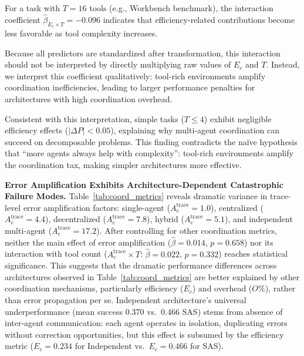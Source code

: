 For a task with $T = 16$ tools (e.g., Workbench benchmark), the interaction coefficient $\hat{\beta}_{E_c \times T} = -0.096$ indicates that efficiency-related contributions become less favorable as tool complexity increases. 

Because all predictors are standardized after transformation, this interaction should not be interpreted by directly multiplying raw values of $E_c$ and $T$. Instead, we interpret this coefficient qualitatively: tool-rich environments amplify coordination inefficiencies, leading to larger performance penalties for architectures with high coordination overhead.

Consistent with this interpretation, simple tasks ($T \leq 4$) exhibit negligible efficiency effects ($|\Delta P| < 0.05$), explaining why multi-agent coordination can succeed on decomposable problems. This finding contradicts the naïve hypothesis that “more agents always help with complexity”: tool-rich environments amplify the coordination tax, making simpler architectures more effective.


\textbf{Error Amplification Exhibits Architecture-Dependent Catastrophic Failure Modes.} Table~\ref{tab:coord_metrics} reveals dramatic variance in trace-level error amplification factors: single-agent ($A_e^{\text{trace}}=1.0$), centralized ($A_e^{\text{trace}}=4.4$), decentralized ($A_e^{\text{trace}}=7.8$), hybrid ($A_e^{\text{trace}}=5.1$), and independent multi-agent ($A_e^{\text{trace}}=17.2$). After controlling for other coordination metrics, neither the main effect of error amplification ($\hat{\beta}=0.014$, $p=0.658$) nor its interaction with tool count ($A_e^{\text{trace}} \times T$: $\hat{\beta}=0.022$, $p=0.332$) reaches statistical significance. This suggests that the dramatic performance differences across architectures observed in Table~\ref{tab:coord_metrics} are better explained by other coordination mechanisms, particularly efficiency ($E_c$) and overhead ($O\%$), rather than error propagation per se. Independent architecture's universal underperformance (mean success 0.370 vs.\ 0.466 SAS) stems from absence of inter-agent communication: each agent operates in isolation, duplicating errors without correction opportunities, but this effect is subsumed by the efficiency metric ($E_c=0.234$ for Independent vs.\ $E_c=0.466$ for SAS).

